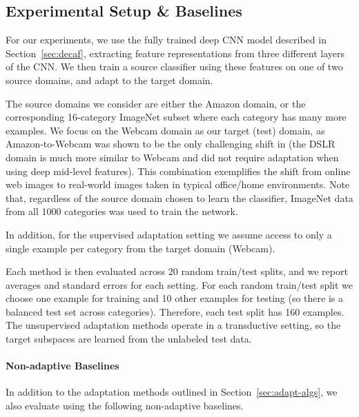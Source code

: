 \subsection{Experimental Setup \& Baselines}

For our experiments, we use the fully trained deep CNN model described in Section~\ref{sec:decaf}, extracting feature
representations from three different layers of the CNN. We then train a source classifier using these features on one of two source domains, and adapt to the target domain.

The source domains we consider are either the Amazon domain, or the corresponding 16-category ImageNet subset where each category has many more examples.
We focus on the Webcam domain as our target (test) domain, as Amazon-to-Webcam  was shown to be the only challenging shift in \cite{deeplearning-arxiv-2013} (the DSLR domain is much more similar to Webcam and did not require adaptation when using deep mid-level features). This combination exemplifies the shift from online web images to real-world images taken in typical office/home environments.
Note that, regardless of the source domain chosen to learn the classifier, ImageNet data from all 1000 categories was used to train the network. 

In addition, for the supervised adaptation setting we assume access to only a single example per category from the target domain (Webcam). 

Each method is then evaluated across 20 random train/test splits, and we report averages and standard errors for each setting. 
For each random train/test split we choose one example for training and 10 other examples for testing (so there is a balanced test set across categories). Therefore, each test split has 160 examples. The unsupervised adaptation methods operate in a transductive setting, so the target subspaces are learned from the unlabeled test data.



\paragraph{Non-adaptive Baselines}
In addition to the adaptation methods outlined in Section~\ref{sec:adapt-algs},
we also evaluate using the following non-adaptive baselines.

